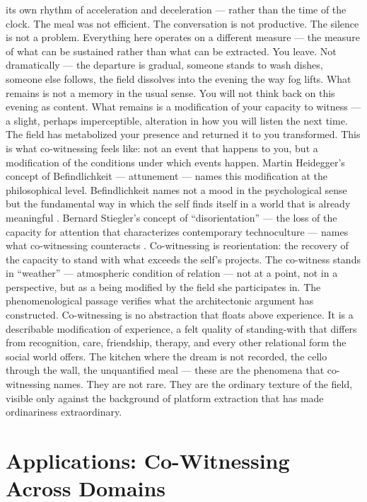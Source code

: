 its own rhythm of acceleration and deceleration — rather than the time of the clock. The meal was not efficient. The conversation is not productive. The silence is not a problem. Everything here operates on a different measure — the measure of what can be sustained rather than what can be extracted. You leave. Not dramatically — the departure is gradual, someone stands to wash dishes, someone else follows, the field dissolves into the evening the way fog lifts. What remains is not a memory in the usual sense. You will not think back on this evening as content. What remains is a modification of your capacity to witness — a slight, perhaps imperceptible, alteration in how you will listen the next time. The field has metabolized your presence and returned it to you transformed. This is what co-witnessing feels like: not an event that happens to you, but a modification of the conditions under which events happen. Martin Heidegger’s concept of Befindlichkeit — attunement — names this modification at the philosophical level. Befindlichkeit names not a mood in the psychological sense but the fundamental way in which the self finds itself in a world that is already meaningful \cite[pp.~172--179]{heidegger_1927}. Bernard Stiegler’s concept of “disorientation” — the loss of the capacity for attention that characterizes contemporary technoculture — names what co-witnessing counteracts \cite[pp.~1--28]{stiegler_2010}. Co-witnessing is reorientation: the recovery of the capacity to stand with what exceeds the self’s projects. The co-witness stands in “weather” — atmospheric condition of relation — not at a point, not in a perspective, but as a being modified by the field she participates in. The phenomenological passage verifies what the architectonic argument has constructed. Co-witnessing is no abstraction that floats above experience. It is a describable modification of experience, a felt quality of standing-with that differs from recognition, care, friendship, therapy, and every other relational form the social world offers. The kitchen where the dream is not recorded, the cello through the wall, the unquantified meal — these are the phenomena that co-witnessing names. They are not rare. They are the ordinary texture of the field, visible only against the background of platform extraction that has made ordinariness extraordinary.

\section{Applications: Co-Witnessing Across Domains}


